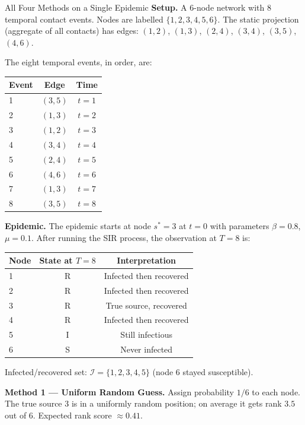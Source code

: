 \begin{examplebox}{All Four Methods on a Single Epidemic}
\textbf{Setup.} A 6-node network with 8 temporal contact events. Nodes are labelled
$\{1, 2, 3, 4, 5, 6\}$. The static projection (aggregate of all contacts) has edges:
$(1,2)$, $(1,3)$, $(2,4)$, $(3,4)$, $(3,5)$, $(4,6)$.

The eight temporal events, in order, are:
\begin{center}
\small
\begin{tabular}{lcc}
\toprule
Event & Edge & Time \\
\midrule
1 & $(3, 5)$ & $t = 1$ \\
2 & $(1, 3)$ & $t = 2$ \\
3 & $(1, 2)$ & $t = 3$ \\
4 & $(3, 4)$ & $t = 4$ \\
5 & $(2, 4)$ & $t = 5$ \\
6 & $(4, 6)$ & $t = 6$ \\
7 & $(1, 3)$ & $t = 7$ \\
8 & $(3, 5)$ & $t = 8$ \\
\bottomrule
\end{tabular}
\end{center}

\textbf{Epidemic.} The epidemic starts at node $s^* = 3$ at $t = 0$ with parameters
$\beta = 0.8$, $\mu = 0.1$. After running the SIR process, the observation at $T = 8$
is:
\begin{center}
\small
\begin{tabular}{lcc}
\toprule
Node & State at $T=8$ & Interpretation \\
\midrule
1 & R & Infected then recovered \\
2 & R & Infected then recovered \\
3 & R & True source, recovered \\
4 & R & Infected then recovered \\
5 & I & Still infectious \\
6 & S & Never infected \\
\bottomrule
\end{tabular}
\end{center}

Infected/recovered set: $\mathcal{I} = \{1, 2, 3, 4, 5\}$ (node 6 stayed susceptible).

\medskip
\textbf{Method 1 — Uniform Random Guess.}
Assign probability $1/6$ to each node. The true source 3 is in a uniformly random
position; on average it gets rank $3.5$ out of 6. Expected rank score $\approx 0.41$.


\end{examplebox}
